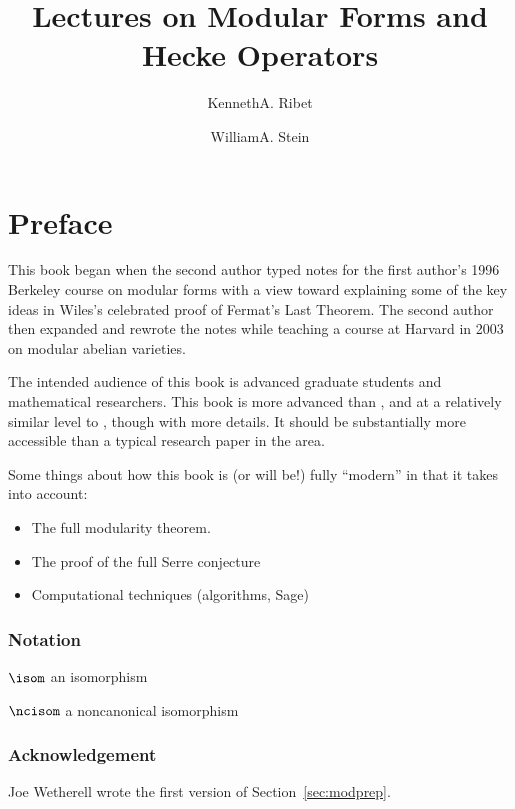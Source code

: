 \documentclass{report}
\author{Kenneth\thinspace{}A. Ribet\and William\thinspace{}A. Stein}
\title{Lectures on Modular Forms and Hecke Operators}
\begin{document}

\maketitle
\tableofcontents
\newpage



\chapter*{Preface}

This book began when the second author typed notes for the first
author's 1996 Berkeley course on modular forms with a view toward
explaining some of the key ideas in Wiles's celebrated proof of
Fermat's Last Theorem.  The second author then expanded and rewrote
the notes while teaching a course at Harvard in 2003 on modular
abelian varieties.

The intended audience of this book is advanced graduate students and
mathematical researchers.  This book is more advanced than
\cite{lozano, stein:modform, diamond-shurman}, and at a relatively
similar level to \cite{diamond-im}, though with more details. It
should be substantially more accessible than a typical research paper
in the area.

Some things about how this book is (or will be!) fully ``modern'' in that it
takes into account:
\begin{itemize}
\item The full modularity theorem.
\item The proof of the full Serre conjecture
\item Computational techniques (algorithms, Sage)
\end{itemize}


\subsection*{Notation}

$\isom$ an isomorphism

$\ncisom$ a noncanonical isomorphism



\subsection*{Acknowledgement}

Joe Wetherell wrote the first version of Section~\ref{sec:modprep}.
\end{document}
